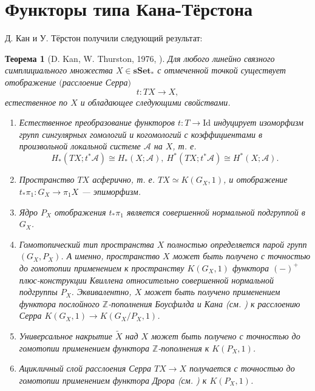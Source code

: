 \documentclass[14pt, dvipsnames, twoside]{extarticle}
\newtheorem{theorem}{Теорема}
\theoremstyle{definition}
\theoremstyle{remark}
\begin{document}
\fi






















\section{Функторы типа Кана-Тёрстона}




Д. Кан и У. Тёрстон получили следующий результат:

\begin{theorem}[D. Kan, W. Thurston, 1976, \cite{Kan}]\label{Kan}
Для любого линейно связного симплициального множества $X\in \mathbf{sSet}_\ast$ с отмеченной точкой существует отображение $($расслоение Серра$)$ $$t: TX\to X,$$ естественное по $X$ и обладающее следующими свойствами.

\begin{enumerate}[$($i$)$]
\item Естественное преобразование функторов $t: T\to \mathrm{Id}$ индуцирует изоморфизм групп сингулярных гомологий и когомологий с коэффициентами в произвольной локальной системе $\mathcal{A}$ на $X$, т. е. $$H_\ast(TX; t^\ast\mathcal{A})\cong H_\ast(X; \mathcal{A}),\ H^\ast(TX; t^\ast\mathcal{A})\cong H^\ast(X; \mathcal{A}).$$

\item Пространство $TX$ асферично, т. е. $TX\simeq K(G_X, 1)$, и отображение $t_\ast\pi_1: G_X \to \pi_1X$ --- эпиморфизм.

\item Ядро $P_X$ отображения $t_\ast\pi_1$ является совершенной нормальной подгруппой в $G_X$.

\item Гомотопический тип пространства $X$ полностью определяется парой групп $(G_X, P_X)$. А именно, пространство $X$ может быть получено с точностью до гомотопии применением к пространству $K(G_X, 1)$ функтора $(-)^+$ плюс-конструкции Квиллена относительно совершенной нормальной подгруппы $P_X$. Эквивалентно, $X$ может быть получено применением функтора послойного $\mathbb{Z}$-пополнения Боусфилда и Кана (см. \cite{BousfieldKan}) к расслоению Серра $K(G_X, 1)\to K(G_X/P_X, 1)$.

\item Универсальное накрытие $\widetilde{X}$ над $X$ может быть получено с точностью до гомотопии применением функтора $\mathbb{Z}$-пополнения к $K(P_X, 1)$.

\item Ацикличный слой расслоения Серра $TX\to X$ получается с точностью до гомотопии применением функтора Дрора (см. \cite{Dror}) к $K(P_X, 1)$.    
\end{enumerate}
\end{theorem}
\end{document}
